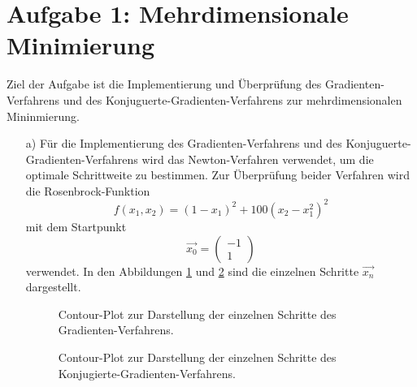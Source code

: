 



\maketitle

\section*{Aufgabe 1: Mehrdimensionale Minimierung}
Ziel der Aufgabe ist die Implementierung und Überprüfung des Gradienten-Verfahrens und des Konjuguerte-Gradienten-Verfahrens zur mehrdimensionalen Mininmierung.
\begin{itemize}[leftmargin=*]
\item[a)] Für die Implementierung des Gradienten-Verfahrens und des Konjuguerte-Gradienten-Verfahrens wird das
          Newton-Verfahren verwendet, um die optimale Schrittweite zu bestimmen.
          Zur Überprüfung beider Verfahren wird die Rosenbrock-Funktion
          \begin{equation*}
            f\left(x_1, x_2\right) = \left(1 - x_1\right)^2 + 100 \left(x_2 - x_1^2\right)^2
          \end{equation*}
          mit dem Startpunkt
          \begin{equation*}
            \vec{x_0} = \begin{pmatrix}
              -1 \\
              1
          \end{pmatrix}
          \end{equation*}
          verwendet. In den Abbildungen \ref{fig:a1_1}  und \ref{fig:a1_2} sind die einzelnen Schritte $\vec{x_n}$ dargestellt.
          \FloatBarrier
          \begin{figure}[H]
              \centering
              \caption{Contour-Plot zur Darstellung der einzelnen Schritte des Gradienten-Verfahrens.}
              \label{fig:a1_1}
          \end{figure}
          \FloatBarrier
          \noindent
          \FloatBarrier
          \begin{figure}[H]
              \centering
              \caption{Contour-Plot zur Darstellung der einzelnen Schritte des Konjugierte-Gradienten-Verfahrens.}
              \label{fig:a1_2}
          \end{figure}

\end{itemize}

